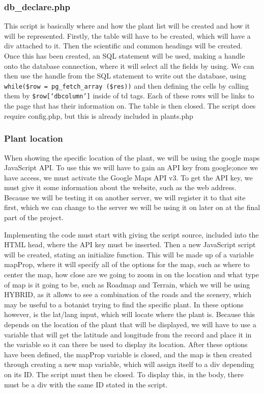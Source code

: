 	\subsubsection{db\_declare.php}
		This script is basically where and how the plant list will be created and how it will be represented. Firstly, the table will have to be created, which will have a div attached to it. Then the scientific and common headings will be created. Once this has been created, an SQL statement will be used, making a handle onto the database connection, where it will select all the fields by using.  We can then use the handle from the SQL statement to write out the database, using \texttt{while(\$row = pg\_fetch\_array (\$res))} and then defining the cells by calling them by \texttt{\$row[`dbcolumn']} inside of td tags.  Each of these rows will be links to the page that has their information on. The table is then closed. The script does require config.php, but this is already included in plants.php

	\subsubsection{Plant location}
		When showing the specific location of the plant, we will be using the google maps JavaScript API. To use this we will have to gain an API key from google;once we have access, we must activate the Google Maps API v3. To get the API key, we must give it some information about the website, such as the web address. Because we will be testing it on another server, we will register it to that site first, which we can change to the server we will be using it on later on at the final part of the project.

		Implementing the code must start with giving the script source, included into the HTML head, where the API key must be inserted.  Then a new JavaScript script will be created, stating an initialize function. This will be made up of a variable mapProp, where it will specify all of the options for the map, such as where to center the map, how close are we going to zoom in on the location and what type of map is it going to be, such as Roadmap and Terrain, which we will be using HYBRID, as it allows to see a combination of the roads and the scenery, which may be useful to a botanist trying to find the specific plant. In these options however, is the lat/lang input, which will locate where the plant is. Because this depends on the location of the plant that will be displayed, we will have to use a variable that will get the latitude and longitude from the record and place it in the variable so it can there be used to display its location. After these options have been defined, the mapProp variable is closed, and the map is then created through creating a new map variable, which will assign itself to a div depending on its ID. The script must then be closed. To display this, in the body, there must be a div with the same ID stated in the script. 

